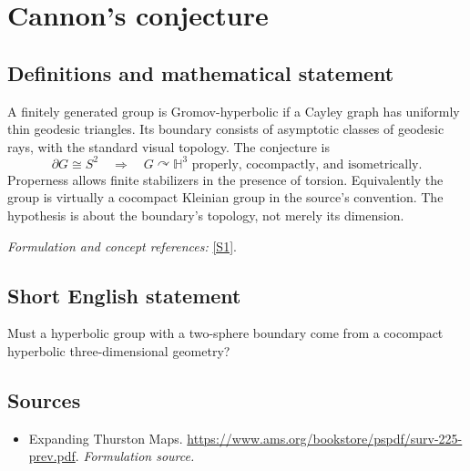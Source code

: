 \documentclass[11pt]{article}
\begin{document}
\section*{\texorpdfstring{Cannon's conjecture}{Cannon's conjecture}}\label{140}
\subsection{Definitions and mathematical statement}
A finitely generated group is Gromov-hyperbolic if a Cayley graph has uniformly thin geodesic triangles. Its boundary consists of asymptotic classes of geodesic rays, with the standard visual topology. The conjecture is
\[
 \partial G\cong S^2\quad\Longrightarrow\quad
 G\curvearrowright\mathbb H^3\text{ properly, cocompactly, and isometrically}.
\]
Properness allows finite stabilizers in the presence of torsion. Equivalently the group is virtually a cocompact Kleinian group in the source's convention. The hypothesis is about the boundary's topology, not merely its dimension.
\par\smallskip\textit{Formulation and concept references:} \href{https://www.ams.org/bookstore/pspdf/surv-225-prev.pdf}{[S1]}.

\subsection{Short English statement}
Must a hyperbolic group with a two-sphere boundary come from a cocompact hyperbolic three-dimensional geometry?
\subsection{Sources}
\begin{itemize}
\item[S1]Expanding Thurston Maps.
\url{https://www.ams.org/bookstore/pspdf/surv-225-prev.pdf}.
\textit{Formulation source.}
\end{itemize}
\end{document}
